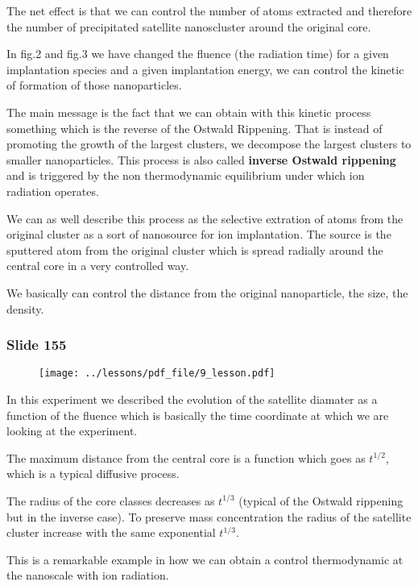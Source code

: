\documentclass[../main/main.tex]{subfiles}
\begin{document}
The net effect is that we can control the number of atoms extracted and therefore the number of precipitated satellite nanoscluster around the original core.

In fig.2 and fig.3 we have changed the fluence (the radiation time) for a given implantation species and a given implantation energy, we can control the kinetic of formation of those nanoparticles.

The main message is the fact that we can obtain with this kinetic process something which is the reverse of the Ostwald Rippening. That is instead of promoting the growth of the largest clusters, we decompose the largest clusters to smaller nanoparticles. This process is also called \textbf{inverse Ostwald rippening} and is triggered by the non thermodynamic equilibrium under which ion radiation operates.

We can as well describe this process as the selective extration of atoms from the original cluster as a sort of nanosource for ion implantation. The source is the sputtered atom from the original cluster which is spread radially around the central core in a very controlled way.

We basically can control the distance from the original nanoparticle, the size, the density.

\newpage

\subsubsection{Slide 155}

\begin{figure}[h!]
\centering
\texttt{[image: ../lessons/pdf\_file/9\_lesson.pdf]}
\end{figure}

In this experiment we described the evolution of the satellite diamater as a function of the fluence which is basically the time coordinate at which we are looking at the experiment.

The maximum distance from the central core is a function which goes as \( t^{1/2} \), which is a typical diffusive process.

The radius of the core classes decreases as \( t^{1/3} \) (typical of the Ostwald rippening but in the inverse case).
To preserve mass concentration the radius of the satellite cluster increase with the same exponential \( t^{1/3} \).

This is a remarkable example in how we can obtain a control thermodynamic at the nanoscale with ion radiation.
\end{document}
